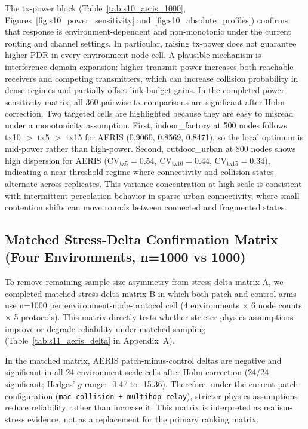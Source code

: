 ﻿\documentclass[sensors,article,submit,moreauthors,pdftex]{Definitions/mdpi}
\begin{document}
The tx-power block (Table~\ref{tab:s10_aeris_1000}, Figures~\ref{fig:s10_power_sensitivity} and~\ref{fig:s10_absolute_profiles}) confirms that response is environment-dependent and non-monotonic under the current routing and channel settings. In particular, raising tx-power does not guarantee higher PDR in every environment-node cell. A plausible mechanism is interference-domain expansion: higher transmit power increases both reachable receivers and competing transmitters, which can increase collision probability in dense regimes and partially offset link-budget gains. In the completed power-sensitivity matrix, all 360 pairwise tx comparisons are significant after Holm correction.
Two targeted cells are highlighted because they are easy to misread under a monotonicity assumption. First, indoor\_factory at 500 nodes follows tx10 $>$ tx5 $>$ tx15 for AERIS (0.9060, 0.8569, 0.8471), so the local optimum is mid-power rather than high-power. Second, outdoor\_urban at 800 nodes shows high dispersion for AERIS (CV$_{\text{tx5}}=0.54$, CV$_{\text{tx10}}=0.44$, CV$_{\text{tx15}}=0.34$), indicating a near-threshold regime where connectivity and collision states alternate across replicates. This variance concentration at high scale is consistent with intermittent percolation behavior in sparse urban connectivity, where small contention shifts can move rounds between connected and fragmented states.

\subsection{Matched Stress-Delta Confirmation Matrix (Four Environments, n=1000 vs 1000)}
To remove remaining sample-size asymmetry from stress-delta matrix A, we completed matched stress-delta matrix B in which both patch and control arms use n=1000 per environment-node-protocol cell (4 environments $\times$ 6 node counts $\times$ 5 protocols). This matrix directly tests whether stricter physics assumptions improve or degrade reliability under matched sampling (Table~\ref{tab:s11_aeris_delta} in Appendix~A).

In the matched matrix, AERIS patch-minus-control deltas are negative and significant in all 24 environment-scale cells after Holm correction (24/24 significant; Hedges' $g$ range: -0.47 to -15.36). Therefore, under the current patch configuration (\texttt{mac-collision + multihop-relay}), stricter physics assumptions reduce reliability rather than increase it. This matrix is interpreted as realism-stress evidence, not as a replacement for the primary ranking matrix.
\end{document}
